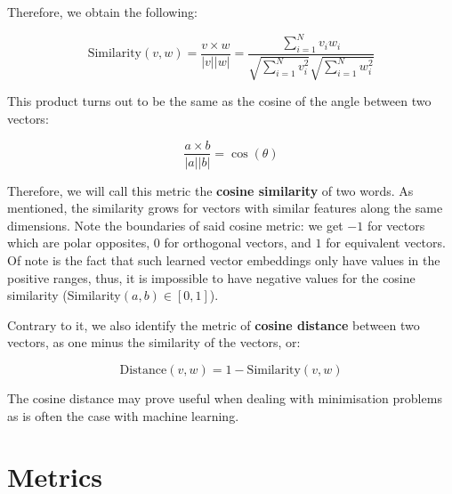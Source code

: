 Therefore, we obtain the following:

$$ \text{Similarity} (v, w) = \frac{v \times w}{|v| |w|} = \frac{\sum_{i=1}^{N} v_i w_i}{\sqrt{\sum_{i=1}^{N}v_i^2} \sqrt{\sum_{i=1}^{N}w_i^2}}$$

This product turns out to be the same as the cosine of the angle between two vectors:

$$ \frac{a \times b}{|a| |b|} = \cos(\theta) $$

Therefore, we will call this metric the \textbf{cosine similarity} of two words. As mentioned, the similarity grows for vectors with similar features along the same dimensions. Note the boundaries of said cosine metric: we get $-1$ for vectors which are polar opposites, $0$ for orthogonal vectors, and $1$ for equivalent vectors. Of note is the fact that such learned vector embeddings only have values in the positive ranges, thus, it is impossible to have negative values for the cosine similarity (Similarity$(a,b) \in [0,1]$).

Contrary to it, we also identify the metric of \textbf{cosine distance} between two vectors, as one minus the similarity of the vectors, or:

$$ \text{Distance}(v,w) = 1 - \text{Similarity}(v,w) $$

The cosine distance may prove useful when dealing with minimisation problems as is often the case with machine learning.




\section{Metrics}